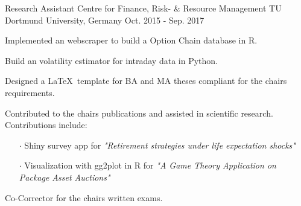 \begin{cventries}
\cventry
{Research Assistant} %
{Centre for Finance, Risk- \& Resource Management} %
{TU Dortmund University, Germany} %
{Oct. 2015 - Sep. 2017} %
{
  \begin{cvitems} %
    \item {Implemented an webscraper to build a Option Chain database in R.}
    \item {Build an volatility estimator for intraday data in Python.}
    \item {Designed a \LaTeX~template for BA and MA theses compliant for the chairs requirements.}
    \item {Contributed to the chairs publications and assisted in scientific research. Contributions include:
      \begin{itemize}
        \item[$\cdot$] Shiny survey app for \textit{"Retirement strategies under life expectation shocks"} 
        \item[$\cdot$] Visualization with gg2plot in R for \textit{"A Game Theory Application on Package Asset Auctions"}
      \end{itemize}
    }
    \item {Co-Corrector for the chairs written exams.}
  \end{cvitems}
}

\end{cventries}

